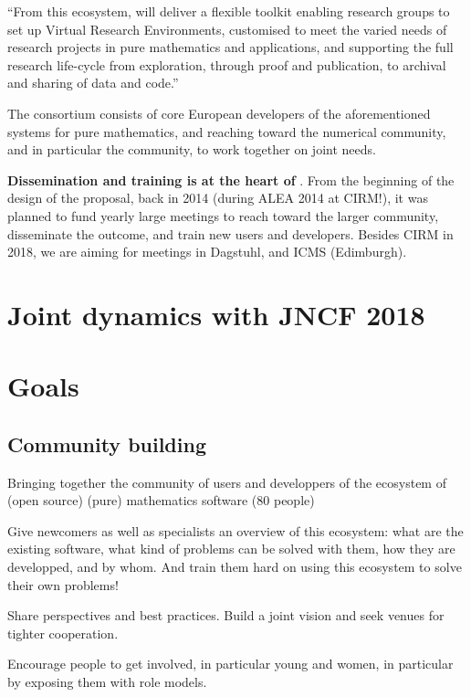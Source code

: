 \documentclass[12pt]{amsbook}
\begin{document}
``From this ecosystem, \ODK will deliver a flexible toolkit enabling
research groups to set up Virtual Research Environments, customised to
meet the varied needs of research projects in pure mathematics and
applications, and supporting the full research life-cycle from
exploration, through proof and publication, to archival and sharing of
data and code.''

The \ODK consortium consists of core European developers of the
aforementioned systems for pure mathematics, and reaching toward the
numerical community, and in particular the \Jupyter community, to work
together on joint needs.

\textbf{Dissemination and training is at the heart of \ODK}. From the
beginning of the design of the proposal, back in 2014 (during ALEA
2014 at CIRM!), it was planned to fund yearly large meetings to reach
toward the larger community, disseminate the outcome, and train new
users and developers. Besides CIRM in 2018, we are aiming for meetings
in Dagstuhl, and ICMS (Edimburgh).


\section{Joint dynamics with JNCF 2018}

\section{Goals}

\subsection{Community building}

Bringing together the community of users and developpers of the
ecosystem of (open source) (pure) mathematics software (80 people)

Give newcomers as well as specialists an overview of this ecosystem:
what are the existing software, what kind of problems can be solved
with them, how they are developped, and by whom. And train them hard
on using this ecosystem to solve their own problems!

Share perspectives and best practices. Build a joint vision and seek
venues for tighter cooperation.

Encourage people to get involved, in particular young and women, in
particular by exposing them with role models.
\end{document}
